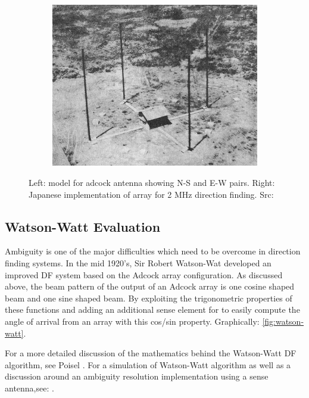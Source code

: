 \begin{figure}
\begin{subfigure}[b]{0.6\textwidth}
    \includegraphics[width=\textwidth]{./img/lit_review/adcock_implementation}
  \end{subfigure}
  \caption{Left: model for adcock antenna showing N-S and E-W pairs. Right: Japanese implementation of array for 2 MHz direction finding. Src: \cite{japanesecommunications}}
  \label{fig:lit_adcock_array}
\end{figure}


\subsection{Watson-Watt Evaluation}
Ambiguity is one of the major difficulties which need to be overcome in direction finding systems. In the mid 1920's, Sir Robert Watson-Wat developed an improved DF system based on the Adcock array configuration. As discussed above, the beam pattern of the output of an Adcock array is one cosine shaped beam and one sine shaped beam. 
By exploiting the trigonometric properties of these functions and adding an additional sense element for to easily compute the angle of arrival from an array with this cos/sin property. Graphically: \autoref{fig:watson-watt}.

For a more detailed discussion of the mathematics behind the Watson-Watt DF algorithm, see Poisel \cite{poisel2008introduction}. For a simulation of Watson-Watt algorithm as well as a discussion around an ambiguity resolution implementation using a sense antenna,see: \cite{adcockwatsonwattrdf}.

